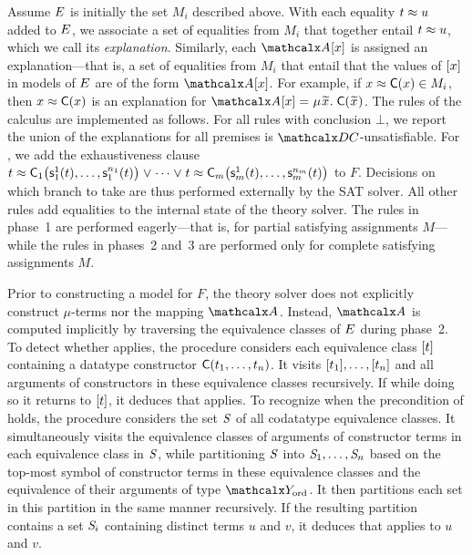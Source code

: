 Assume $E$ is initially the set $M_i$ described above. With each equality $t \approx u$ added
to $E$, we associate a set of equalities from $M_i$ that together entail $t
\approx u$, which we call its \emph{explanation}.
Similarly, each $\Val \ec{x}$ is assigned an explanation---that is, a set
of equalities from $M_i$ that entail that the values of $[x]$ in models of
$E$ are of the form $\Val \ec{x}$. For example, if $x \approx \textsf{C}( x ) \in
M_i$, then $x \approx \textsf{C}( x )$ is an %
explanation for $\Val \ec{x} = \MU {\Varec{x}}.\; \const{C}( {\Varec{x}} )$.
The rules of the calculus are implemented as follows. For all rules with
conclusion $\bot$, we report the union of the explanations for all premises is
$\thD$-unsatisfiable. For , we add the exhaustiveness clause %
$t \approx \textsf{C}_{1}\bigl(\textsf{s}^1_{1}( t ), \ldots,\textsf{s}^{n_{1}}_{1}( t )\bigr) \mathrel\lor \cdots \mathrel\lor t \approx \textsf{C}_{m}\bigl(\textsf{s}^1_{m}( t ), \ldots,\textsf{s}^{n_{m}}_{m}( t )\bigr)$ to $F$.
Decisions on which branch to take are thus performed externally by the SAT
solver. %
All other rules add equalities to the
internal state of the theory solver. The rules in phase~1 are performed
eagerly---that is, for partial satisfying assignments $M$---while the rules in
phases~2 and~3 are performed only for complete satisfying
assignments $M$. 

Prior to constructing a model for $F\!$, the theory solver does not explicitly construct $\mu$-terms nor the mapping $\Val$.
Instead, $\Val$ is computed implicitly by traversing the equivalence classes of $E$ during phase~2.
To detect whether  applies,
the procedure considers each equivalence class $[t]$ containing a datatype constructor $\textsf{C}( t_1, \ldots, t_n )$.
It visits $[t_1], \ldots, [t_n]$ and all arguments of constructors in these equivalence classes recursively.
If while doing so it returns to $[t]$, it deduces that  applies. %
To recognize when the precondition of  holds,
the procedure considers the set $\mathit{S}$ of all codatatype equivalence classes.
It simultaneously visits the equivalence classes of arguments of constructor terms in each equivalence class in $\mathit{S}$,
while partitioning $\mathit{S}$ into $\mathit{S}_1, \ldots, \mathit{S}_n$ based on the top-most symbol of constructor terms in these equivalence classes
and the equivalence of their arguments of type $\Nondata$.
It then partitions each set in this partition in the same manner recursively.
If %
the resulting partition contains a set $\mathit{S}_i$ containing distinct terms $u$
and $v$, it deduces that  applies to $u$ and $v$.

